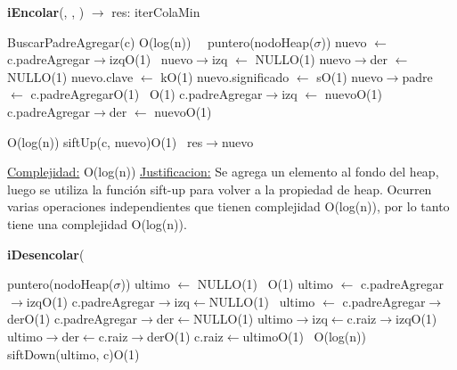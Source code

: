 \begin{Representacion}
\begin{Algoritmos}
\begin{algorithm}[H]{\textbf{iEncolar}(, , ) $\to$ res: iterColaMin}
\begin{algorithmic}[1]
		\State BuscarPadreAgregar(c) \Comment O(log(n))
		\,
		\ puntero(nodoHeap($\sigma$)) nuevo $\leftarrow$ c.padreAgregar$\rightarrow$izq\Comment O(1)
		\,
		\State nuevo$\rightarrow$izq $\leftarrow$ NULL\Comment O(1)
		\State nuevo$\rightarrow$der $\leftarrow$ NULL\Comment O(1)
		\State nuevo.clave $\leftarrow$ k\Comment O(1)
		\State nuevo.significado $\leftarrow$ s\Comment O(1)
		\State nuevo$\rightarrow$padre $\leftarrow$ c.padreAgregar\Comment O(1)
		\,	
		\Comment O(1)
			\State c.padreAgregar$\rightarrow$izq $\leftarrow$ nuevo\Comment O(1)
		\,
		\Else
			\State c.padreAgregar$\rightarrow$der $\leftarrow$ nuevo\Comment O(1)
		\EndIf
		\,
				
		\Comment O(log(n))
			\State siftUp(c, nuevo)\Comment O(1)
		\EndWhile			
		\,		
		\State res$\rightarrow$nuevo
		
		
		\medskip
		\Statex \underline{Complejidad:} O(log(n))
			\Statex \underline{Justificacion:} Se agrega un elemento al fondo del heap, luego se utiliza la función sift-up para volver a la propiedad de heap. Ocurren varias operaciones independientes que tienen complejidad O(log(n)), por lo tanto tiene una complejidad O(log(n)).
	\end{algorithmic}
\end{algorithm}


\begin{algorithm}[H]{\textbf{iDesencolar}(}
	\begin{algorithmic}[1]

		\State puntero(nodoHeap($\sigma$)) ultimo $\leftarrow$ NULL\Comment O(1)
		\,
		\Comment O(1)
			\State ultimo $\leftarrow$ c.padreAgregar$\rightarrow$izq\Comment O(1)
			\State c.padreAgregar$\rightarrow$izq$\leftarrow$NULL\Comment O(1)
			\,
		\Else
			\State ultimo $\leftarrow$ c.padreAgregar$\rightarrow$der\Comment O(1)
			\State c.padreAgregar$\rightarrow$der$\leftarrow$NULL\Comment O(1)
		\EndIf
		\State ultimo$\rightarrow$izq$\leftarrow$c.raiz$\rightarrow$izq\Comment O(1)
		\State ultimo$\rightarrow$der$\leftarrow$c.raiz$\rightarrow$der\Comment O(1)
		\State c.raiz$\leftarrow$ultimo\Comment O(1)
		\,
		 \Comment O(log(n))
			\State siftDown(ultimo, c)\Comment O(1)
		\EndWhile
		

\end{algorithmic}
\end{algorithm}
\end{Algoritmos}
\end{Representacion}

